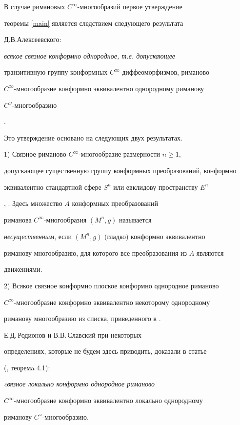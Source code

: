 \begin{notes}


В случае римановых $C^{\infty}$-многообразий первое утверждение


теоремы \ref{main} является следствием следующего результата


Д.В.Алексеевского:





{\it всякое связное конформно однородное, т.е. допускающее


транзитивную группу конформных $C^{\infty}$-диффеоморфизмов, риманово


$C^{\infty}$-многообразие конформно эквивалентно однородному риманову


$C^{\omega}$-многообразию}.





Это утверждение основано на следующих двух результатах.





1) Связное риманово $C^{\infty}$-многообразие размерности $n\geq 1$,


допускающее существенную группу конформных преобразований, конформно


эквивалентно стандартной сфере $S^{n}$ или евклидову пространству $E^{n}$


\cite{Aleks}, \cite{Aleks1}. Здесь множество $A$ конформных преобразований


риманова $C^{\infty}$-мно\-гообразия $(M^{n},g)$ называется


{\it несущественным}, если $(M^{n},g)$ (гладко) конформно эквивалентно


риманову многообразию, для которого все преобразования из $A$ являются


движениями.





2) Всякое связное конформно плоское конформно однородное риманово


$C^{\infty}$-многообразие конформно эквивалентно некоторому однородному


риманову многообразию из списка, приведенного в \cite{Aleks2}.





Е.Д.\,Родионов и В.В.\,Славский при некоторых


определениях, которые не будем здесь приводить, доказали в статье


(\cite{RS}, теоремa 4.1):





{\it cвязное локально конформно однородное риманово


$C^{\infty}$-многообразие конформно эквивалентно локально однородному 


риманову $C^{\omega}$-многообразию.}


\end{notes}








